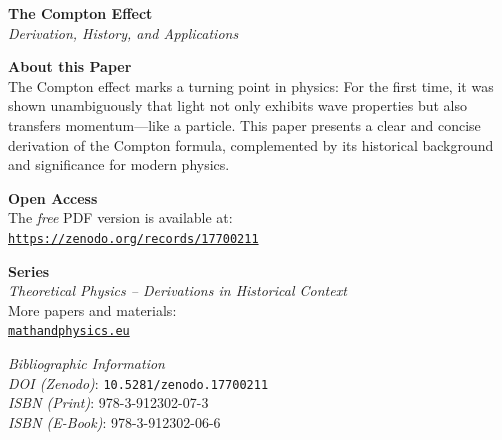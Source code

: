 \documentclass[12pt,oneside]{scrartcl}
\renewcommand*{\bibfont}{\small}
\newcommand{\PaperDOI}{\emph{DOI (Zenodo)}: \texttt{10.5281/zenodo.17700211}}
\newcommand{\PaperISBNPDF}{\emph{ISBN (Print)}: 978-3-912302-07-3}
\newcommand{\PaperISBNEPUB}{\emph{ISBN (E-Book)}: 978-3-912302-06-6}
\begin{document}
	\renewcommand*{\bibfont}{\small}
\printbibliography

	
	\clearpage
	\thispagestyle{empty}
	
	\vspace*{1.5cm}
	
	{\Large\bfseries The Compton Effect}\\[0.5em]
	{\large\itshape Derivation, History, and Applications}
	
	\vspace{1.2cm}
	
	\noindent
	\textbf{About this Paper}\\
	The Compton effect marks a turning point in physics:
	For the first time, it was shown unambiguously that light not only
	exhibits wave properties but also transfers momentum—like a particle.
	This paper presents a clear and concise derivation of the Compton
	formula, complemented by its historical background and significance
	for modern physics.
	
	\vspace{1.0cm}
	
	\noindent
	\textbf{Open Access}\\
	The \emph{free} PDF version is available at:\\[2pt]
	\href{https://zenodo.org/records/17700211}{\texttt{https://zenodo.org/records/17700211}}
	
	\vspace{0.8cm}
	
	\noindent
	\textbf{Series}\\
	\textit{Theoretical Physics – Derivations in Historical Context}\\
	More papers and materials:\\
	\href{https://mathandphysics.eu}{\texttt{mathandphysics.eu}}
	
	\vfill
	
	\noindent
	\small
	\textit{Bibliographic Information}\\
	\PaperDOI\\
	\PaperISBNPDF\\
	\PaperISBNEPUB
	
\end{document}
